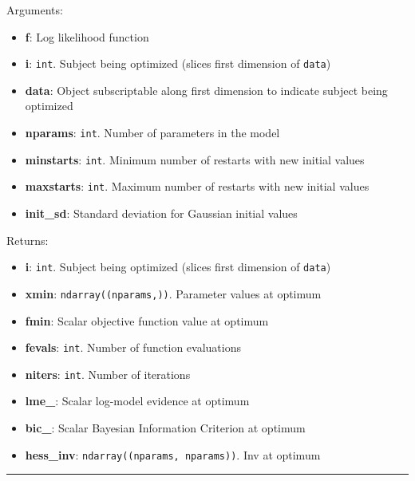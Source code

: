 Arguments:

\begin{itemize}
\tightlist
\item
  \textbf{f}: Log likelihood function
\item
  \textbf{i}: \texttt{int}. Subject being optimized (slices first
  dimension of \texttt{data})
\item
  \textbf{data}: Object subscriptable along first dimension to indicate
  subject being optimized
\item
  \textbf{nparams}: \texttt{int}. Number of parameters in the model
\item
  \textbf{minstarts}: \texttt{int}. Minimum number of restarts with new
  initial values
\item
  \textbf{maxstarts}: \texttt{int}. Maximum number of restarts with new
  initial values
\item
  \textbf{init\_sd}: Standard deviation for Gaussian initial values
\end{itemize}

Returns:

\begin{itemize}
\tightlist
\item
  \textbf{i}: \texttt{int}. Subject being optimized (slices first
  dimension of \texttt{data})
\item
  \textbf{xmin}: \texttt{ndarray((nparams,))}. Parameter values at
  optimum
\item
  \textbf{fmin}: Scalar objective function value at optimum
\item
  \textbf{fevals}: \texttt{int}. Number of function evaluations
\item
  \textbf{niters}: \texttt{int}. Number of iterations
\item
  \textbf{lme\_}: Scalar log-model evidence at optimum
\item
  \textbf{bic\_}: Scalar Bayesian Information Criterion at optimum
\item
  \textbf{hess\_inv}: \texttt{ndarray((nparams,\ nparams))}. Inv at
  optimum
\end{itemize}

\begin{center}\rule{0.5\linewidth}{\linethickness}\end{center}
